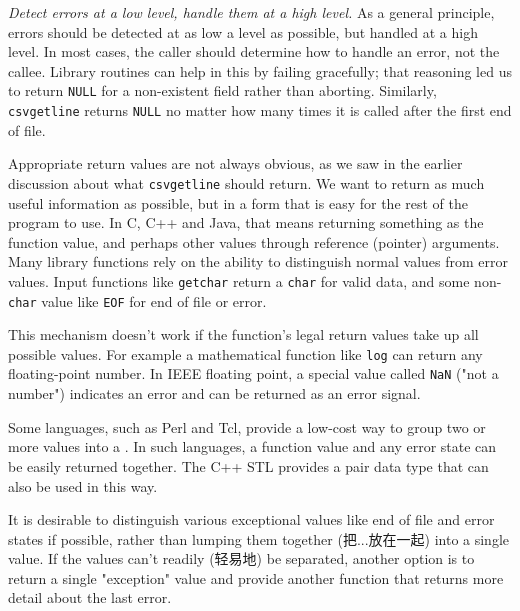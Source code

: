 \emph{Detect errors at a low level, handle them at a high level.} As a
general principle, errors should be detected at as low a level as possible,
but handled at a high level. In most cases, the caller should determine how
to handle an error, not the callee. Library routines can help in this by
failing gracefully; that reasoning led us to return \verb'NULL' for a
non-existent field rather than aborting. Similarly, \verb'csvgetline'
returns \verb'NULL' no matter how many times it is called after the first
end of file.

Appropriate return values are not always obvious, as we saw in the earlier
discussion about what \verb'csvgetline' should return. We want to return as
much useful information as possible, but in a form that is easy for the
rest of the program to use. In C, C++ and Java, that means returning
something as the function value, and perhaps other values through reference
(pointer) arguments. Many library functions rely on the ability to
distinguish normal values from error values. Input functions like
\verb'getchar' return a \verb'char' for valid data, and some
non-\verb'char' value like \verb'EOF' for end of file or error.

This mechanism doesn't work if the function's legal return values take up
all possible values. For example a mathematical function like \verb'log'
can return any floating-point number. In IEEE floating point, a special
value called \verb'NaN' ("not a number") indicates an error and can be
returned as an error signal.

Some languages, such as Perl and Tcl, provide a low-cost way to group two
or more values into a . In such languages, a function value and
any error state can be easily returned together. The C++ STL provides a
pair data type that can also be used in this way.

It is desirable to distinguish various exceptional values like end of file
and error states if possible, rather than lumping them together
(把...放在一起) into a single value.  If the values can't readily (轻易地)
be separated, another option is to return a single "exception" value and
provide another function that returns more detail about the last error.


